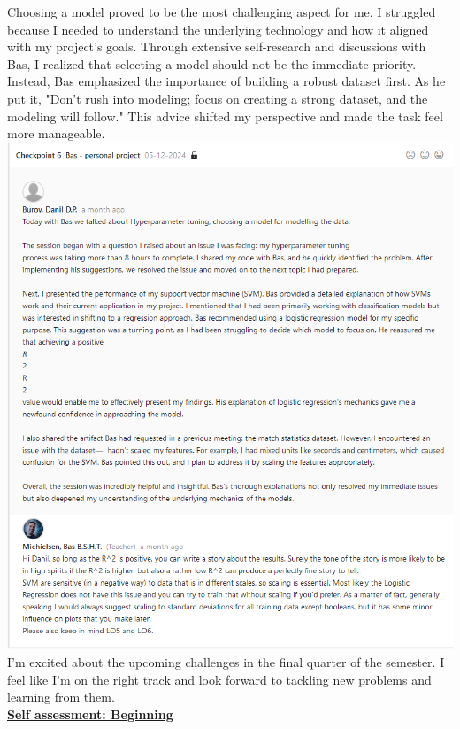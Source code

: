 \documentclass{article}
\begin{document}
	Choosing a model proved to be the most challenging aspect for me. I struggled because I needed to understand the underlying technology and how it aligned with my project’s goals. Through extensive self-research and discussions with Bas, I realized that selecting a model should not be the immediate priority. Instead, Bas emphasized the importance of building a robust dataset first. As he put it, "Don’t rush into modeling; focus on creating a strong dataset, and the modeling will follow." This advice shifted my perspective and made the task feel more manageable.\\
	  \includegraphics[width=\textwidth]{images/Feedback_Bas_2.png}\\
	\newpage
	I’m excited about the upcoming challenges in the final quarter of the semester. I feel like I’m on the right track and look forward to tackling new problems and learning from them.\\
	  \underline{\textbf{Self assessment: Beginning}}
\end{document}
